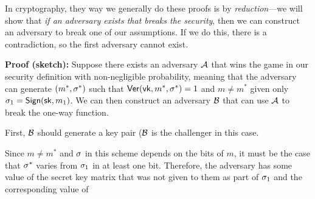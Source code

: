 In cryptography, they way we generally do these proofs is by \emph{reduction}---we will show that \emph{if an adversary exists that breaks the security}, then we can construct an adversary to break one of our assumptions. If we do this, there is a contradiction, so the first adversary cannot exist.

\textbf{Proof (sketch):} Suppose there exists an adversary $\mathcal{A}$ that wins the game in our security definition with non-negligible probability, meaning that the adversary can generate $(m^*, \sigma^*)$ such that $\mathsf{Ver}(\mathsf{vk}, m^*, \sigma^*) = 1$ and $m \neq m^*$ given only $\sigma_1 = \mathsf{Sign}({\mathsf{sk}}, m_1)$. We can then construct an adversary $\mathcal{B}$ that can use $\mathcal{A}$ to break the one-way function.

First, $\mathcal{B}$ should generate a key pair ($\mathcal{B}$ is the challenger in this case.

Since $m \neq m^*$ and $\sigma$ in this scheme depends on the bits of $m$, it must be the case that $\sigma^*$ varies from $\sigma_1$ in at least one bit. Therefore, the adversary has some value of the secret key matrix that was not given to them as part of $\sigma_1$ and the corresponding value of

